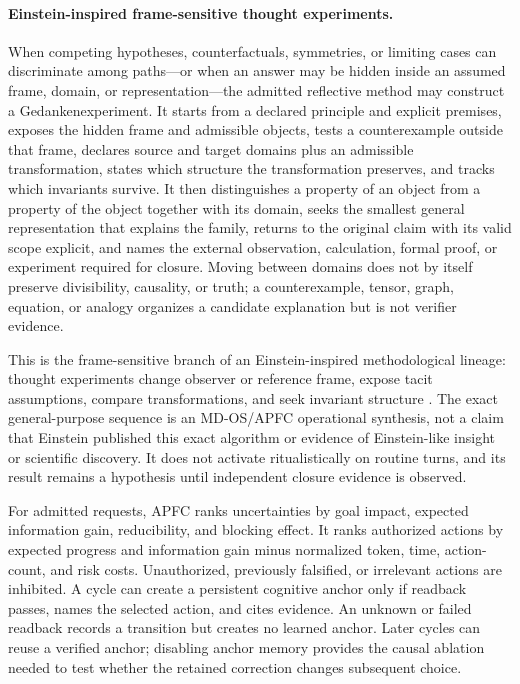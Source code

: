 \documentclass[10pt,twocolumn]{article}
\theoremstyle{definition}
\theoremstyle{plain}
\theoremstyle{remark}
\begin{document}
\paragraph{Einstein-inspired frame-sensitive thought experiments.}
When competing hypotheses, counterfactuals, symmetries, or limiting cases can discriminate among paths---or when an answer may be hidden inside an assumed frame, domain, or representation---the admitted reflective method may construct a Gedankenexperiment.  It starts from a declared principle and explicit premises, exposes the hidden frame and admissible objects, tests a counterexample outside that frame, declares source and target domains plus an admissible transformation, states which structure the transformation preserves, and tracks which invariants survive.  It then distinguishes a property of an object from a property of the object together with its domain, seeks the smallest general representation that explains the family, returns to the original claim with its valid scope explicit, and names the external observation, calculation, formal proof, or experiment required for closure.  Moving between domains does not by itself preserve divisibility, causality, or truth; a counterexample, tensor, graph, equation, or analogy organizes a candidate explanation but is not verifier evidence.

This is the frame-sensitive branch of an Einstein-inspired methodological lineage: thought experiments change observer or reference frame, expose tacit assumptions, compare transformations, and seek invariant structure \citep{poessel2010equivalence,howardgiovanelli2025einstein}.  The exact general-purpose sequence is an MD-OS/APFC operational synthesis, not a claim that Einstein published this exact algorithm or evidence of Einstein-like insight or scientific discovery.  It does not activate ritualistically on routine turns, and its result remains a hypothesis until independent closure evidence is observed.

For admitted requests, APFC ranks uncertainties by goal impact, expected information gain, reducibility, and blocking effect.  It ranks authorized actions by expected progress and information gain minus normalized token, time, action-count, and risk costs.  Unauthorized, previously falsified, or irrelevant actions are inhibited.  A cycle can create a persistent cognitive anchor only if readback passes, names the selected action, and cites evidence.  An unknown or failed readback records a transition but creates no learned anchor.  Later cycles can reuse a verified anchor; disabling anchor memory provides the causal ablation needed to test whether the retained correction changes subsequent choice.
\end{document}
